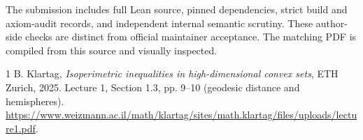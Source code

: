 \documentclass[10pt]{article}
\begin{document}
The submission includes full Lean source, pinned dependencies, strict build and axiom-audit records, and independent internal semantic scrutiny. These author-side checks are distinct from official maintainer acceptance. The matching PDF is compiled from this source and visually inspected.

\begin{thebibliography}{1}
 B. Klartag, \emph{Isoperimetric inequalities in high-dimensional convex sets}, ETH Zurich, 2025. Lecture 1, Section 1.3, pp. 9--10 (geodesic distance and hemispheres). \url{https://www.weizmann.ac.il/math/klartag/sites/math.klartag/files/uploads/lecture1.pdf}.
\end{thebibliography}
\end{document}
